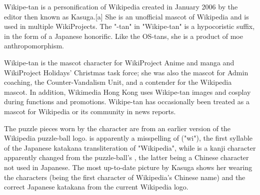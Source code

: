Wikipe-tan  is a personification of Wikipedia created in January 2006 by the editor then known as Kasuga.[a] She is an unofficial mascot of Wikipedia and is used in multiple WikiProjects. The "-tan" in "Wikipe-tan" is a hypocoristic suffix, in the form of a Japanese honorific. Like the OS-tans, she is a product of moe anthropomorphism.

Wikipe-tan is the mascot character for WikiProject Anime and manga and WikiProject Holidays' Christmas task force; she was also the mascot for Admin coaching, the Counter-Vandalism Unit, and a contender for the Wikipedia mascot. In addition, Wikimedia Hong Kong uses Wikipe-tan images and cosplay during functions and promotions. Wikipe-tan has occasionally been treated as a mascot for Wikipedia or its community in news reports.

The puzzle pieces worn by the character are from an earlier version of the Wikipedia puzzle-ball logo.  is apparently a misspelling of  ("wi"), the first syllable of the Japanese katakana transliteration of "Wikipedia", while  is a kanji character apparently changed from the puzzle-ball's , the latter being a Chinese character not used in Japanese. The most up-to-date picture by Kasuga shows her wearing the characters  (being the first character of Wikipedia's Chinese name) and the correct Japanese katakana from the current Wikipedia logo.


